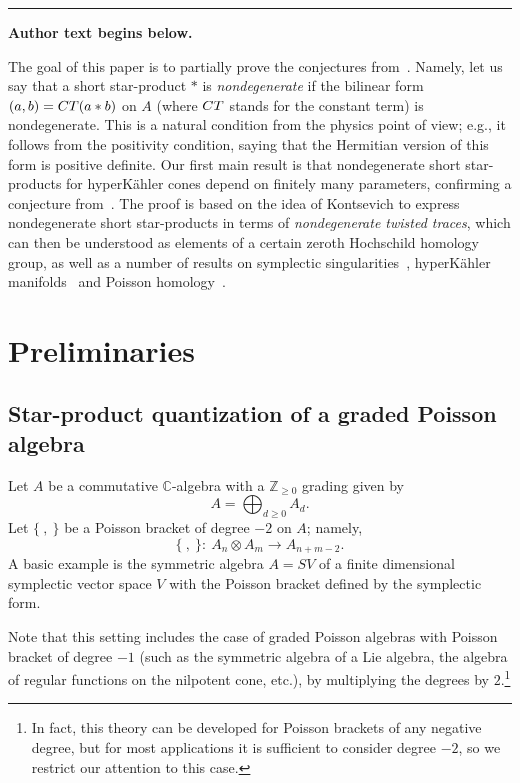 \documentclass[11pt]{article}
\numberwithin{equation}{section}
\numberwithin{equation}{section}
\newcommand{\Z}{\mathbb{Z}}
\begin{document}
\medskip\hrule\medskip\noindent\textbf{Author text begins below.}\par
\setcounter{section}{1}
The goal of this paper is to partially prove the conjectures from~\cite{BPR}.
Namely, let us say that a short star-product $*$ is {\it nondegenerate}
if the bilinear form $(a,b)={\rm CT}(a*b)$ on $A$ (where ${\rm CT}$ stands for the constant term)
 is nondegenerate. This is a natural condition from the physics point of view; e.g.,
it follows from the positivity condition, saying that the Hermitian version of this form is positive definite. Our first main result is that nondegenerate short star-products for hyperK\"ahler cones depend on finitely many parameters, confirming a conjecture from~\cite{BPR}.
The proof is based on the idea of Kontsevich to express nondegenerate short star-products in terms of {\it nondegenerate twisted traces}, which can then be understood as elements of a certain zeroth Hochschild homology group, as well as a number of results on symplectic singularities~\cite{Ka,L2,Na3}, hyperK\"ahler manifolds~\cite{HKLR} and Poisson homology~\cite{ES}.

\setcounter{footnote}{3}
\section{Preliminaries}\label{section2}

\subsection{Star-product quantization of a graded Poisson algebra}
Let $A$ be a commutative ${\mathbb C}$-algebra with a $\Z_{\geq 0}$ grading given by
\[
A = \bigoplus_{d \geq 0} A_d.
\]
Let $\{~,~\}$ be a Poisson bracket of degree $-2$ on $A$; namely,
\[
\{~,~\} \colon \ A_n \otimes A_m \to A_{n+m-2}.
\]
A basic example is the symmetric algebra $A=SV$ of a finite dimensional symplectic vector space $V$
with the Poisson bracket defined by the symplectic form.

Note that this setting includes the case of graded Poisson algebras with Poisson bracket of degree $-1$ (such as the symmetric algebra of a Lie algebra, the algebra of regular functions on the nilpotent cone, etc.), by multiplying the degrees by $2$.\footnote{In fact, this theory can be developed for Poisson brackets of any negative degree, but for most applications it is sufficient to consider degree $-2$, so we restrict our attention to this case.}
\end{document}
